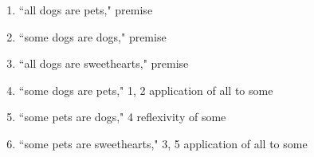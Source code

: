 \documentclass{article}
\begin{document}
	\begin{enumerate}\item ``all dogs are pets," premise
\item ``some dogs are dogs," premise
\item ``all dogs are sweethearts," premise
\item ``some dogs are pets," 1, 2 application of all to some\item ``some pets are dogs," 4 reflexivity of some\item ``some pets are sweethearts," 3, 5 application of all to some

\end{enumerate}
\end{document}
